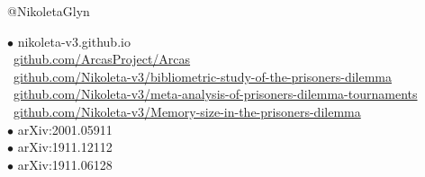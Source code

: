 \documentclass{beamer}
\begin{document}
\begin{frame}
    \begin{center}
    \faTwitter @NikoletaGlyn \\
    
    \vspace{1cm}
    \end{center}

    \footnotesize
    $\bullet$ nikoleta-v3.github.io \\
    \faGithub \ \url{github.com/ArcasProject/Arcas} \\
    \faGithub \ \url{github.com/Nikoleta-v3/bibliometric-study-of-the-prisoners-dilemma} \\
    \faGithub \ \url{github.com/Nikoleta-v3/meta-analysis-of-prisoners-dilemma-tournaments} \\
    \faGithub \ \url{github.com/Nikoleta-v3/Memory-size-in-the-prisoners-dilemma} \\
    $\bullet$ arXiv:2001.05911 \\
    $\bullet$ arXiv:1911.12112 \\
    $\bullet$ arXiv:1911.06128 \\
\end{frame}
\end{document}
